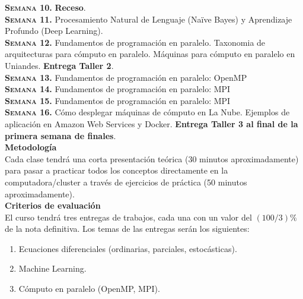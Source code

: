 \documentclass[letterpaper,10pt,onecolumn]{article}
\begin{document}
\noindent\textbf{\textsc{Semana 10.}}  
{\bf Receso}.
\\[-0.3cm] 

\noindent\textbf{\textsc{Semana 11.}}  
Procesamiento Natural de Lenguaje (Naïve Bayes) y Aprendizaje Profundo
(Deep Learning). 
\\[-0.3cm] 

\noindent\textbf{\textsc{Semana 12.}}  
Fundamentos de programaci\'on en paralelo. Taxonomia de arquitecturas
para c\'omputo en paralelo. M\'aquinas para c\'omputo en paralelo en
Uniandes. {\bf Entrega Taller 2}.
\\[-0.3cm]  

\noindent\textbf{\textsc{Semana 13.}} 
Fundamentos de programaci\'on en paralelo: OpenMP
\\[-0.3cm]  

\noindent\textbf{\textsc{Semana 14.}} 
Fundamentos de programaci\'on en paralelo: MPI
\\[-0.3cm] 

\noindent\textbf{\textsc{Semana 15.}} 
Fundamentos de programaci\'on en paralelo: MPI
\\[-0.3cm] 

\noindent\textbf{\textsc{Semana 16.}} 
C\'omo desplegar m\'aquinas de c\'omputo en La Nube. Ejemplos de
aplicaci\'on en Amazon Web Services y Docker.  {\bf Entrega Taller 3 al final de la primera semana de finales}.
\\[-0.1cm]  


\noindent\textbf{\large {} \quad
  Metodolog\'ia}\\[-0.2cm] 


\noindent\normalsize Cada clase tendr\'a una corta presentaci\'on
te\'orica (30 minutos aproximadamente) para pasar a practicar todos
los conceptos directamente en la computadora/cluster a trav\'es de
ejercicios de pr\'actica (50 minutos aproximadamente). \\[0.1cm]


\noindent\textbf{\large {} \quad Criterios de
  evaluaci\'on}\\[-0.2cm] 


El curso tendr\'a tres entregas de trabajos, cada una con un valor
del $(100/3) \%$ de la nota definitiva. Los temas de las entregas ser\'an
los siguientes:
\begin{enumerate}
\item Ecuaciones diferenciales (ordinarias, parciales, estoc\'asticas).
\\[-0.6cm]
\item Machine Learning.
\\[-0.6cm]
\item C\'omputo en paralelo (OpenMP, MPI).
\\[-0.2cm]
\end{enumerate}
\end{document}
